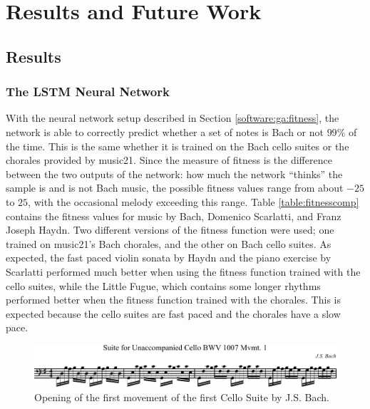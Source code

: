 \chapter{Results and Future Work} \label{results_future}

\section{Results} \label{results}


\subsection{The LSTM Neural Network}

With the neural network setup described in Section \ref{software:ga:fitness}, the network is able to correctly predict whether a set of notes is Bach or not $99\%$ of the time.
This is the same whether it is trained on the Bach cello suites or the chorales provided by music21.
Since the measure of fitness is the difference between the two outputs of the network: how much the network ``thinks'' the sample is and is not Bach music, the possible fitness values range from about $-25$ to $25$, with the occasional melody exceeding this range.
Table \ref{table:fitnesscomp} contains the fitness values for music by Bach, Domenico Scarlatti, and Franz Joseph Haydn.
Two different versions of the fitness function were used; one trained on music21's Bach chorales, and the other on Bach cello suites.
As expected, the fast paced violin sonata by Haydn and the piano exercise by Scarlatti performed much better when using the fitness function trained with the cello suites, while the Little Fugue, which contains some longer rhythms performed better when the fitness function trained with the chorales.
This is expected because the cello suites are fast paced and the chorales have a slow pace.

\begin{figure}[]
	\centering
	\includegraphics[width=\linewidth]{figures/cello_suite.pdf}
	\caption{Opening of the first movement of the first Cello Suite by J.S. Bach.}
	\label{fig:music:cello_suite}
\end{figure}

